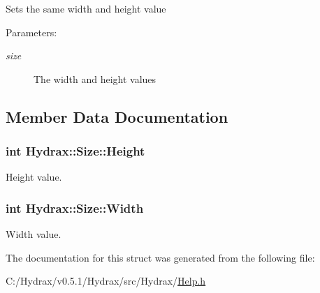 Sets the same width and height value \begin{Desc}
\item[Parameters:]
\begin{description}
\item[{\em size}]The width and height values \end{description}
\end{Desc}


\subsection{Member Data Documentation}
\hypertarget{struct_hydrax_1_1_size_24e29f4f28eb941f06d9f424807691e6}{
\subsubsection[{Height}]{\setlength{\rightskip}{0pt plus 5cm}int {\bf Hydrax::Size::Height}}}
\label{struct_hydrax_1_1_size_24e29f4f28eb941f06d9f424807691e6}


Height value. 

\hypertarget{struct_hydrax_1_1_size_5dfca2c4f9a35424d03dfbbe34da0b84}{
\subsubsection[{Width}]{\setlength{\rightskip}{0pt plus 5cm}int {\bf Hydrax::Size::Width}}}
\label{struct_hydrax_1_1_size_5dfca2c4f9a35424d03dfbbe34da0b84}


Width value. 



The documentation for this struct was generated from the following file:\begin{CompactItemize}
\item 
C:/Hydrax/v0.5.1/Hydrax/src/Hydrax/\hyperlink{_help_8h}{Help.h}\end{CompactItemize}
